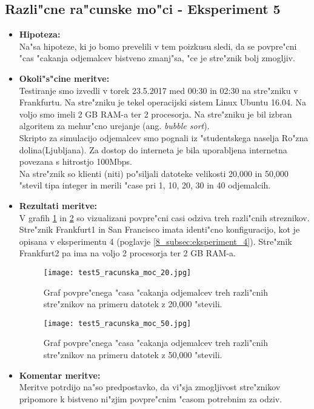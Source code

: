 \subsection{Razli"cne ra"cunske mo"ci - Eksperiment 5}
\begin{itemize}
	\item \textbf{Hipoteza: }  \\
		Na"sa hipoteze, ki jo bomo prevelili v tem poizkusu sledi, da se povpre"cni "cas "cakanja odjemalcev bistveno zmanj"sa, "ce je stre"znik bolj zmogljiv.
			
	\item \textbf{Okoli"s"cine meritve: } \\
		Testiranje smo izvedli v torek 23.5.2017 med 00:30 in 02:30 na stre"zniku v Frankfurtu. Na stre"zniku je tekel operacijski sistem Linux Ubuntu 16.04. Na voljo smo imeli 2 GB RAM-a ter 2 procesorja. Na stre"zniku je bil izbran algoritem za mehur"cno urejanje (ang. \textit{bubble sort}).\\ Skripto za simulacijo odjemalcev smo pognali iz "studentskega naselja Ro"zna dolina(Ljubljana). Za dostop do interneta je bila uporabljena internetna povezana s hitrostjo 100Mbps.\\ Na stre"znik so klienti (niti) po"siljali datoteke velikosti 20,000 in 50,000 "stevil tipa integer in merili "case pri 1, 10, 20, 30 in 40 odjemalcih.

 	\item \textbf{Rezultati meritve: }  \\
 	
		V grafih \ref{8_graf_racunska_moc_20} in \ref{8_graf_racunska_moc_50} so vizualizani povpre"cni casi odziva treh razli"cnih streznikov. Stre"znik Frankfurt1 in San Francisco imata identi"cno konfiguracijo, kot je opisana v eksperimentu 4 (poglavje \ref{8_subsec:eksperiment_4}). Stre"znik Frankfurt2 pa ima na voljo 2 procesorja ter 2 GB RAM-a.
		
		\begin{figure}[h]
  		\centering
  		  \texttt{[image: test5\_racunska\_moc\_20.jpg]}
  		\caption{Graf povpre"cnega "casa "cakanja odjemalcev treh razli"cnih stre"znikov na primeru datotek z 20,000 "stevili.}
  		\label{8_graf_racunska_moc_20}
		\end{figure}

	\begin{figure}[h]
  		\centering
  		  \texttt{[image: test5\_racunska\_moc\_50.jpg]}
  		\caption{Graf povpre"cnega "casa "cakanja odjemalcev treh razli"cnih stre"znikov na primeru datotek z 50,000 "stevili.}
  		\label{8_graf_racunska_moc_50}
		\end{figure}
	\pagebreak
	\item \textbf{Komentar meritve: } \\ 
		Meritve potrdijo na"so predpostavko, da vi"sja zmogljivost stre"znikov pripomore k bistveno ni"zjim povpre"cnim "casom potrebnim za odziv.
\end{itemize}

